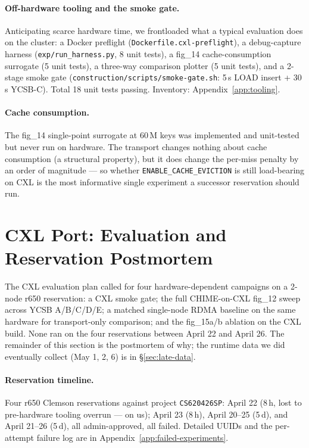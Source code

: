 \documentclass[11pt,a4paper]{article}
\begin{document}
\paragraph{Off-hardware tooling and the smoke gate.} Anticipating scarce hardware time, we frontloaded what a typical evaluation does on the cluster: a Docker preflight (\texttt{Dockerfile.cxl-preflight}), a debug-capture harness (\texttt{exp/run\_harness.py}, 8 unit tests), a fig\_14 cache-consumption surrogate (5 unit tests), a three-way comparison plotter (5 unit tests), and a 2-stage smoke gate (\texttt{construction/scripts/smoke-gate.sh}: 5\,s LOAD insert + 30\,s YCSB-C). Total 18 unit tests passing. Inventory: Appendix~\ref{app:tooling}.

\paragraph{Cache consumption.}\label{sec:cxl-fig14} The fig\_14 single-point surrogate at 60\,M keys was implemented and unit-tested but never run on hardware. The transport changes nothing about cache consumption (a structural property), but it does change the per-miss penalty by an order of magnitude --- so whether \texttt{ENABLE\_CACHE\_EVICTION} is still load-bearing on CXL is the most informative single experiment a successor reservation should run.

\section{CXL Port: Evaluation and Reservation Postmortem}
\label{sec:postmortem}

The CXL evaluation plan called for four hardware-dependent campaigns on a 2-node r650 reservation: a CXL smoke gate; the full CHIME-on-CXL fig\_12 sweep across YCSB A/B/C/D/E; a matched single-node RDMA baseline on the same hardware for transport-only comparison; and the fig\_15a/b ablation on the CXL build. None ran on the four reservations between April 22 and April 26. The remainder of this section is the postmortem of why; the runtime data we did eventually collect (May 1, 2, 6) is in §\ref{sec:late-data}.

\paragraph{Reservation timeline.} Four r650 Clemson reservations against project \texttt{CS620426SP}: April 22 (8\,h, lost to pre-hardware tooling overrun --- on us); April 23 (8\,h), April 20--25 (5\,d), and April 21--26 (5\,d), all admin-approved, all failed. Detailed UUIDs and the per-attempt failure log are in Appendix~\ref{app:failed-experiments}.
\end{document}
